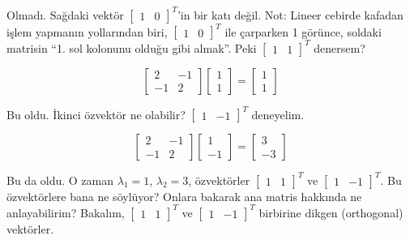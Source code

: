 \documentclass[12pt,fleqn]{article}\usepackage{../../common}
\begin{document}
Olmadı. Sağdaki vektör $\left[\begin{array}{cc}1&0\end{array}\right]^T$'in bir
katı değil. Not: Lineer cebirde kafadan işlem yapmanın yollarından biri,
$\left[\begin{array}{cc}1&0\end{array}\right]^T$ ile çarparken 1 görünce,
soldaki matrisin ``1. sol kolonunu olduğu gibi almak''. Peki $\left[\begin{array}{cc}1&1\end{array}\right]^T$ denersem?

$$ \left[\begin{array}{rr} 2 & -1 \\ -1 & 2
\end{array}\right]
\left[\begin{array}{c}
1 \\
1
\end{array}\right]
=
\left[\begin{array}{c}
1 \\
1
\end{array}\right]
 $$

Bu oldu. İkinci özvektör ne olabilir?
$\left[\begin{array}{cc}1&-1\end{array}\right]^T$ deneyelim.

$$ 
\left[\begin{array}{rr}
2 & -1 \\
-1 & 2
\end{array}\right]
\left[\begin{array}{r}
1 \\
-1
\end{array}\right]
=
\left[\begin{array}{r}
3 \\
-3
\end{array}\right]
 $$

Bu da oldu. O zaman $\lambda_1 = 1$, $\lambda_2 = 3$, özvektörler
$\left[\begin{array}{cc} 1 & 1 \end{array}\right]^T$ ve $\left[\begin{array}{cc}
    1 & -1 \end{array}\right]^T$. Bu özvektörlere bana ne söylüyor? Onlara
bakarak ana matris hakkında ne anlayabilirim? Bakalım, $\left[\begin{array}{cc}
    1 & 1 \end{array}\right]^T$ ve $\left[\begin{array}{cc} 1 &
    -1\end{array}\right]^T$ birbirine dikgen (orthogonal) vektörler.
\end{document}
